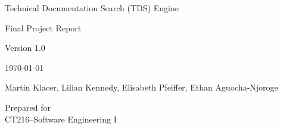 \documentclass[12pt, a4paper]{article}
\newcommand{\projectname}{Technical Documentation Search (TDS) Engine}
\begin{document}
\begin{titlepage}
    \centering
    \vspace*{4cm}
    {\Large \projectname \par}
    \vspace{2cm}
    {\Large Final Project Report \par}
    \vspace{0.5cm}
    {\Large Version 1.0 \par}
    \vspace{0.5cm}
    {\Large \today \par}
    \vspace{2cm}
    {\Large Martin Klacer, Lilian Kennedy, Elisabeth Pfeiffer, Ethan Aguocha-Njoroge \par}
    \vfill

    Prepared for\\
    CT216--Software Engineering I\par

\end{titlepage}

\tableofcontents
\newpage

































\end{document}

